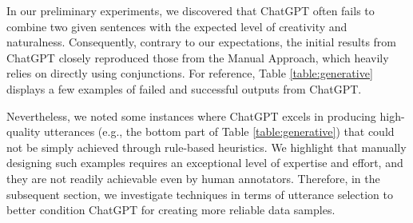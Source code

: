 In our preliminary experiments, we discovered that ChatGPT often fails to combine two given sentences with the expected level of creativity and naturalness.
Consequently, contrary to our expectations, the initial results from ChatGPT closely reproduced those from the Manual Approach, which heavily relies on directly using conjunctions.
For reference, Table \ref{table:generative} displays a few examples of failed and successful outputs from ChatGPT.

Nevertheless, we noted some instances where ChatGPT excels in producing high-quality utterances (e.g., the bottom part of Table \ref{table:generative}) that could not be simply achieved through rule-based heuristics.
We highlight that manually designing such examples requires an exceptional level of expertise and effort, and they are not readily achievable even by human annotators.
Therefore, in the subsequent section, we investigate techniques in terms of utterance selection to better condition ChatGPT for creating more reliable data samples.
